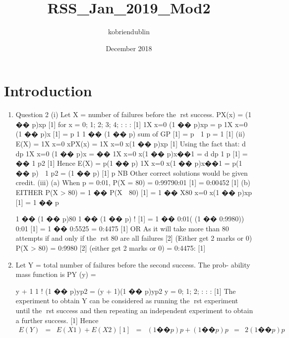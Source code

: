 \documentclass{article}
\title{RSS_Jan_2019_Mod2}
\author{kobriendublin }
\date{December 2018}
\begin{document}
\maketitle

\section{Introduction}

\begin{enumerate}
    \item Question 2 (i) Let X = number of failures before the rst success.
PX(x) = (1 �� p)xp [1]
for x = 0; 1; 2; 3; 4; : : : [1]
1X
x=0
(1 �� p)xp = p
1X
x=0
(1 �� p)x [1]
= p
1
1 �� (1 �� p)
sum of GP [1]
= p 
1
p
= 1 [1]
(ii)
E(X) =
1X
x=0
xPX(x)
=
1X
x=0
x(1 �� p)xp [1]
Using the fact that:
d
dp
1X
x=0
(1 �� p)x = ��
1X
x=0
x(1 �� p)x��1
=
d
dp
1
p
[1]
= ��
1
p2 [1]
Hence
E(X) = p(1 �� p)
1X
x=0
x(1 �� p)x��1
= p(1 �� p) 
1
p2
=
(1 �� p)
[1]
p
NB Other correct solutions would be given credit.
(iii) (a) When p = 0:01,
P(X = 80) = 0:99790:01 [1]
= 0:00452 [1]
(b) EITHER
P(X > 80) = 1 �� P(X  80) [1]
= 1 ��
X80
x=0
x(1 �� p)xp [1]
= 1 �� p
 
1 �� (1 �� p)80
1 �� (1 �� p)
!
[1]
= 1 �� 0:01(
(1 �� 0:9980))
0:01
[1]
= 1 �� 0:5525
= 0:4475 [1]
OR As it will take more than 80 attempts if and only if the rst 80
are all failures [2]
(Either get 2 marks or 0)
P(X > 80) = 0:9980 [2]
(either get 2 marks or 0)
= 0:4475: [1]

\item  Let Y = total number of failures before the second success. The prob-
ability mass function is
PY (y) =
 
y + 1
1
!
(1 �� p)yp2 = (y + 1)(1 �� p)yp2 y = 0; 1; 2; : : : [1]
The experiment to obtain Y can be considered as running the rst
experiment until the rst success and then repeating an independent
experiment to obtain a further success. [1]
Hence
\begin{eqnarray}
E(Y ) &=& E(X1) + E(X2) [1]
&=&
(1 �� p)
p
+
(1 �� p)
p
&=& 2
(1 �� p)
p
\end{eqnarray}
\end{enumerate}
\end{document}
